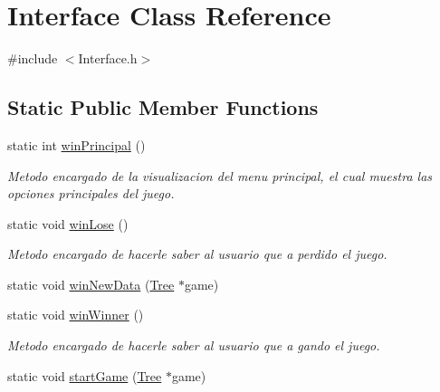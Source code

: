 \hypertarget{class_interface}{}\section{Interface Class Reference}
\label{class_interface}


{\ttfamily \#include $<$Interface.\+h$>$}

\subsection*{Static Public Member Functions}
\begin{DoxyCompactItemize}
\item 
\mbox{\label{class_interface_ac6edebd0660c76f190eceb9cbecc7e59}} 
static int \mbox{\hyperlink{class_interface_ac6edebd0660c76f190eceb9cbecc7e59}{win\+Principal}} ()
\begin{DoxyCompactList}\small\item\em Metodo encargado de la visualizacion del menu principal, el cual muestra las opciones principales del juego. \end{DoxyCompactList}\item 
\mbox{\label{class_interface_a001825ca909fb316d5b4d7db65680bea}} 
static void \mbox{\hyperlink{class_interface_a001825ca909fb316d5b4d7db65680bea}{win\+Lose}} ()
\begin{DoxyCompactList}\small\item\em Metodo encargado de hacerle saber al usuario que a perdido el juego. \end{DoxyCompactList}\item 
static void \mbox{\hyperlink{class_interface_acdee7e4ed00d8fa01a8f5f397a7d5f75}{win\+New\+Data}} (\mbox{\hyperlink{class_tree}{Tree}} $\ast$game)
\item 
\mbox{\label{class_interface_a773e59eb1fe93e5e300b4bcb5ecd2fa4}} 
static void \mbox{\hyperlink{class_interface_a773e59eb1fe93e5e300b4bcb5ecd2fa4}{win\+Winner}} ()
\begin{DoxyCompactList}\small\item\em Metodo encargado de hacerle saber al usuario que a gando el juego. \end{DoxyCompactList}\item 
static void \mbox{\hyperlink{class_interface_ae5610c5276f6839e66435b28547605c1}{start\+Game}} (\mbox{\hyperlink{class_tree}{Tree}} $\ast$game)

\end{DoxyCompactItemize}
